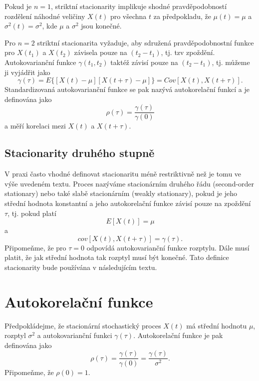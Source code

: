 Pokud je $n = 1$, striktní stacionarity implikuje shodné pravděpodobností rozdělení náhodné veličiny $X(t)$ pro všechna $t$ za předpokladu, že $\mu(t) = \mu$ a $\sigma^2(t) = \sigma^2$, kde $\mu$ a $\sigma^2$ jsou konečné.

Pro $n = 2$ striktní stacionarita vyžaduje, aby sdružená pravděpodobnostní funkce pro $X(t_1)$ a $X(t_2)$ závisela pouze na $(t_2 - t_1)$, tj. tzv zpoždění. Autokovarianční funkce $\gamma(t_1, t_2)$ taktéž závisí pouze na $(t_2 - t_1)$, tj. můžeme ji vyjádřit jako
\begin{equation}
\gamma(\tau) = E\{[X(t) - \mu][X(t+\tau) - \mu]\} = Cov[X(t), X(t + \tau)].
\end{equation}
Standardizovaná autokovarianční funkce se pak nazývá autokorelační funkcí a je definována jako
\begin{equation}
\rho(\tau) = \frac{\gamma(\tau)}{\gamma(0)}
\end{equation}
a měří korelaci mezi $X(t)$ a $X(t + \tau)$.

\subsection{Stacionarity druhého stupně}

V praxi často vhodné definovat stacionaritu méně restriktivně než je tomu ve výše uvedeném textu. Proces nazýváme stacionárním druhého řádu (second-order stationary) nebo také slabě stacionárním (weakly stationary), pokud je jeho střední hodnota konstantní a jeho autokorelační funkce závisí pouze na zpoždění $\tau$, tj. pokud platí
\begin{equation}
E[X(t)] = \mu
\end{equation}
a
\begin{equation}
cov[X(t), X(t + \tau)] = \gamma(\tau).
\end{equation}
Připomeňme, že pro $\tau = 0$ odpovídá autokovarianční funkce rozptylu. Dále musí platit, že jak střední hodnota tak rozptyl musí být konečné. Tato definice stacionarity bude používána v následujícím textu.

\section{Autokorelační funkce}

Předpokládejme, že stacionární stochastický proces $X(t)$ má střední hodnotu $\mu$, rozptyl $\sigma^2$ a autokovarianční funkci $\gamma(\tau)$. Autokorelační funkce je pak definována jako
\begin{equation}
\rho(\tau) = \frac{\gamma(\tau)}{\gamma(0)} = \frac{\gamma(\tau)}{\sigma^2}.
\end{equation}
Připomeňme, že $\rho(0) = 1$.

